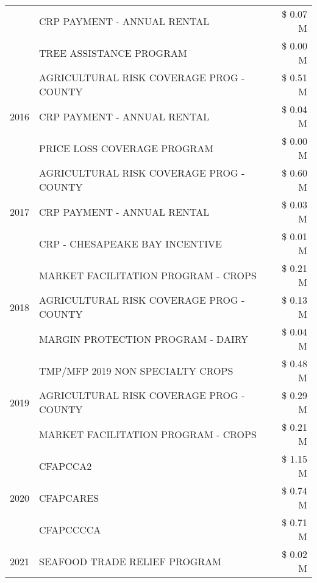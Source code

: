 \begin{tabular}{llr}
 & CRP PAYMENT - ANNUAL RENTAL & \$ 0.07 M \\
 & TREE ASSISTANCE PROGRAM & \$ 0.00 M \\
\cline{1-3}
\multirow[t]{3}{*}{2016} & AGRICULTURAL RISK COVERAGE PROG - COUNTY & \$ 0.51 M \\
 & CRP PAYMENT - ANNUAL RENTAL & \$ 0.04 M \\
 & PRICE LOSS COVERAGE PROGRAM & \$ 0.00 M \\
\cline{1-3}
\multirow[t]{3}{*}{2017} & AGRICULTURAL RISK COVERAGE PROG - COUNTY & \$ 0.60 M \\
 & CRP PAYMENT - ANNUAL RENTAL & \$ 0.03 M \\
 & CRP - CHESAPEAKE BAY INCENTIVE & \$ 0.01 M \\
\cline{1-3}
\multirow[t]{3}{*}{2018} & MARKET FACILITATION PROGRAM - CROPS & \$ 0.21 M \\
 & AGRICULTURAL RISK COVERAGE PROG - COUNTY & \$ 0.13 M \\
 & MARGIN PROTECTION PROGRAM - DAIRY & \$ 0.04 M \\
\cline{1-3}
\multirow[t]{3}{*}{2019} & TMP/MFP 2019 NON SPECIALTY CROPS & \$ 0.48 M \\
 & AGRICULTURAL RISK COVERAGE PROG - COUNTY & \$ 0.29 M \\
 & MARKET FACILITATION PROGRAM - CROPS & \$ 0.21 M \\
\cline{1-3}
\multirow[t]{3}{*}{2020} & CFAPCCA2 & \$ 1.15 M \\
 & CFAPCARES & \$ 0.74 M \\
 & CFAPCCCCA & \$ 0.71 M \\
\cline{1-3}
2021 & SEAFOOD TRADE RELIEF PROGRAM & \$ 0.02 M \\
\cline{1-3}
\bottomrule
\end{tabular}
